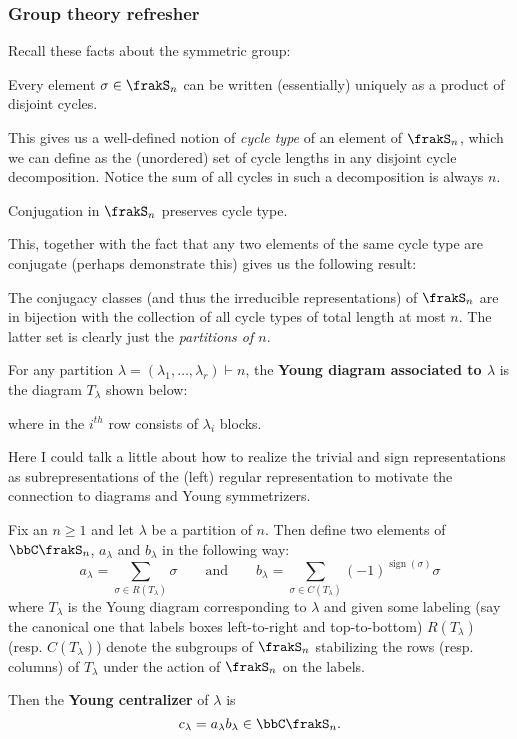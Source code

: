 \documentclass[12pt]{article}
\begin{document}
		\subsubsection{Group theory refresher}
		Recall these facts about the symmetric group:
		\begin{lem}
			Every element $\sigma\in\frakS_n$ can be written (essentially) uniquely as a product 
			of disjoint cycles.
		\end{lem}
		\begin{rmk}
			This gives us a well-defined notion of \textit{cycle type} of an element of $\frakS_n$, which we can define as 
			the (unordered) set of cycle lengths in any disjoint cycle decomposition. Notice the sum of all 
			cycles in such a decomposition is always $n$.
		\end{rmk}
		\begin{lem}
			Conjugation in $\frakS_n$ preserves cycle type.
		\end{lem}
		This, together with the fact that any two elements of the same cycle type are conjugate (perhaps demonstrate this)
		gives us the following result:
		\begin{thm}
			The conjugacy classes (and thus the irreducible representations) of $\frakS_n$ are in bijection 
			with the collection of all cycle types of total length at most $n$. The latter set is clearly 
			just the \textit{partitions of $n$}.
		\end{thm}
		\begin{defn}
			For any partition $\lambda=(\lambda_1,\dots,\lambda_r)\vdash n$, the \textbf{Young diagram associated to $\lambda$}
			is the diagram $T_\lambda$ shown below:
			\begin{center}
				\ytableaushort{
				\,\,{\none[\dots]} \,\,, \,\,{\none[\dots]}\,, {\none[\vdots]}, \,
				}
			\end{center}
			where in the $i^{th}$ row consists of $\lambda_i$ blocks.
		\end{defn}
		Here I could talk a little about how to realize the trivial and sign representations as subrepresentations of the (left) regular 
		representation to motivate the connection to diagrams and Young symmetrizers.
		\begin{defn}
			Fix an $n\ge 1$ and let $\lambda$ be a partition of $n$. Then define two elements of $\bbC\frakS_n$, $a_\lambda$ and $b_\lambda$ in the following way:
			\[a_\lambda=\sum_{\sigma\in R(T_\lambda)}\sigma\qquad\text{and}\qquad b_\lambda=\sum_{\sigma\in C(T_\lambda)}(-1)^{\operatorname{sign}(\sigma)}\sigma\]
			where $T_\lambda$ is the Young diagram corresponding to $\lambda$ and given some labeling (say the canonical one that labels boxes left-to-right and top-to-bottom)
			$R(T_\lambda)$ (resp. $C(T_\lambda)$) denote the subgroups of $\frakS_n$ stabilizing the rows (resp. columns) of $T_\lambda$ under the action of $\frakS_n$ on the labels.
		
			Then the \textbf{Young centralizer} of $\lambda$ is 
			\[c_\lambda=a_\lambda b_\lambda\in\bbC\frakS_n.\]
		\end{defn}
\end{document}
